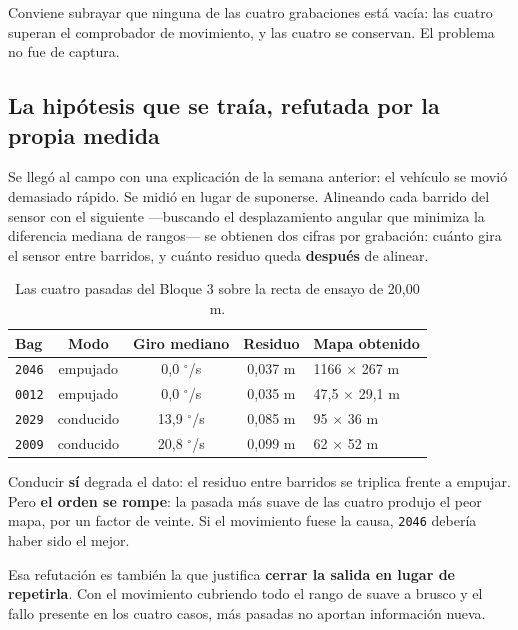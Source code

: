 \documentclass[12pt,letterpaper]{article}
\begin{document}
Conviene subrayar que ninguna de las cuatro grabaciones está vacía: las cuatro superan el comprobador de movimiento, y las cuatro se conservan. El problema no fue de captura.

\subsection{La hipótesis que se traía, refutada por la propia medida}

Se llegó al campo con una explicación de la semana anterior: el vehículo se movió demasiado rápido. Se midió en lugar de suponerse. Alineando cada barrido del sensor con el siguiente ---buscando el desplazamiento angular que minimiza la diferencia mediana de rangos--- se obtienen dos cifras por grabación: cuánto gira el sensor entre barridos, y cuánto residuo queda \textbf{después} de alinear.

\begin{table}[H]
    \centering
    \small
    \caption{Las cuatro pasadas del Bloque 3 sobre la recta de ensayo de 20,00 m.}
    \label{tab:pasadas}
    \begin{tabular}{@{}lcccl@{}}
        \toprule
        \textbf{Bag} & \textbf{Modo} & \textbf{Giro mediano} & \textbf{Residuo} & \textbf{Mapa obtenido} \\ \midrule
        \texttt{2046} & empujado  & 0,0 $^\circ$/s  & 0,037 m & 1166 $\times$ 267 m \\ \addlinespace
        \texttt{0012} & empujado  & 0,0 $^\circ$/s  & 0,035 m & 47,5 $\times$ 29,1 m \\ \addlinespace
        \texttt{2029} & conducido & 13,9 $^\circ$/s & 0,085 m & 95 $\times$ 36 m \\ \addlinespace
        \texttt{2009} & conducido & 20,8 $^\circ$/s & 0,099 m & 62 $\times$ 52 m \\ \bottomrule
    \end{tabular}
\end{table}

Conducir \textbf{sí} degrada el dato: el residuo entre barridos se triplica frente a empujar. Pero \textbf{el orden se rompe}: la pasada más suave de las cuatro produjo el peor mapa, por un factor de veinte. Si el movimiento fuese la causa, \texttt{2046} debería haber sido el mejor.

Esa refutación es también la que justifica \textbf{cerrar la salida en lugar de repetirla}. Con el movimiento cubriendo todo el rango de suave a brusco y el fallo presente en los cuatro casos, más pasadas no aportan información nueva.
\end{document}
